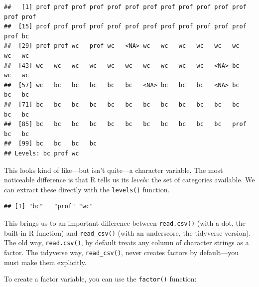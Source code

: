 \documentclass[12pt,oneside,openany]{book}
\newenvironment{Shaded}{\begin{snugshade}}{\end{snugshade}}
\newcommand{\KeywordTok}[1]{\textcolor[rgb]{0.13,0.29,0.53}{\textbf{#1}}}
\newcommand{\OperatorTok}[1]{\textcolor[rgb]{0.81,0.36,0.00}{\textbf{#1}}}
\newcommand{\NormalTok}[1]{#1}
\begin{document}
\begin{Shaded}
\end{Shaded}

\begin{verbatim}
##   [1] prof prof prof prof prof prof prof prof prof prof prof prof prof prof
##  [15] prof prof prof prof prof prof prof prof prof prof prof prof prof bc  
##  [29] prof prof wc   prof wc   <NA> wc   wc   wc   wc   wc   wc   wc   wc  
##  [43] wc   wc   wc   wc   wc   wc   wc   wc   wc   wc   <NA> bc   wc   wc  
##  [57] wc   bc   bc   bc   bc   bc   <NA> bc   bc   bc   <NA> bc   bc   bc  
##  [71] bc   bc   bc   bc   bc   bc   bc   bc   bc   bc   bc   bc   bc   bc  
##  [85] bc   bc   bc   bc   bc   bc   bc   bc   bc   bc   bc   prof bc   bc  
##  [99] bc   bc   bc   bc  
## Levels: bc prof wc
\end{verbatim}

This looks kind of like---but isn't quite---a character variable. The
most noticeable difference is that R tells us its \emph{levels}: the set
of categories available. We can extract these directly with the
\texttt{levels()} function.

\begin{Shaded}
\end{Shaded}

\begin{verbatim}
## [1] "bc"   "prof" "wc"
\end{verbatim}

This brings us to an important difference between \texttt{read.csv()}
(with a dot, the built-in R function) and \texttt{read\_csv()} (with an
underscore, the tidyverse version). The old way, \texttt{read.csv()}, by
default treats any column of character strings as a factor. The
tidyverse way, \texttt{read\_csv()}, never creates factors by
default---you must make them explicitly.

To create a factor variable, you can use the \texttt{factor()} function:
\end{document}
